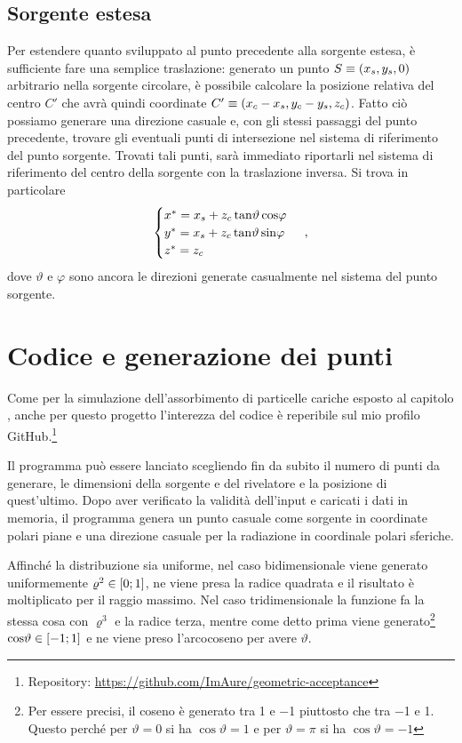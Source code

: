         \subsection{Sorgente estesa}
            Per estendere quanto sviluppato al punto precedente alla sorgente estesa, è sufficiente fare una semplice traslazione: generato un punto $S\equiv\pqty{x_s, y_s, 0}$ arbitrario nella sorgente circolare, è possibile calcolare la posizione relativa del centro $C'$ che avrà quindi coordinate $C'\equiv\pqty{x_c - x_s, y_c - y_s, z_c}$. Fatto ciò possiamo generare una direzione casuale e, con gli stessi passaggi del punto precedente, trovare gli eventuali punti di intersezione nel sistema di riferimento del punto sorgente. Trovati tali punti, sarà immediato riportarli nel sistema di riferimento del centro della sorgente con la traslazione inversa. Si trova in particolare
            \begin{equation*}
                \begin{cases}
                    x^* = x_s + z_c\tan\!\vartheta\cos\!\varphi \\
                    y^* = x_s + z_c\tan\!\vartheta\sin\!\varphi \\
                    z^* = z_c
                \end{cases}
                \,,
            \end{equation*}
            dove $\vartheta$ e $\varphi$ sono ancora le direzioni generate casualmente nel sistema del punto sorgente.
    
    \section{Codice e generazione dei punti}
        Come per la simulazione dell'assorbimento di particelle cariche esposto al capitolo , anche per questo progetto l'interezza del codice è reperibile sul mio profilo GitHub.\footnote{Repository: \url{https://github.com/ImAure/geometric-acceptance}}

        Il programma può essere lanciato scegliendo fin da subito il numero di punti da generare, le dimensioni della sorgente e del rivelatore e la posizione di quest'ultimo. Dopo aver verificato la validità dell'input e caricati i dati in memoria, il programma genera un punto casuale come sorgente in coordinate polari piane e una direzione casuale per la radiazione in coordinale polari sferiche.
        
        Affinché la distribuzione sia uniforme, nel caso bidimensionale viene generato uniformemente $\varrho^2 \in \bqty{0;1}$, ne viene presa la radice quadrata e il risultato è moltiplicato per il raggio massimo. Nel caso tridimensionale la funzione fa la stessa cosa con $\varrho^3$ e la radice terza, mentre come detto prima viene generato\footnote{Per essere precisi, il coseno è generato tra \num{1} e \num{-1} piuttosto che tra \num{-1} e \num{1}. Questo perché per $\vartheta = 0$ si ha $\cos\!\vartheta = \num{1}$ e per $\vartheta = \pi$ si ha $\cos\!\vartheta = \num{-1}$} $\cos\!\vartheta \in \bqty{-1;1}$ e ne viene preso l'arcocoseno per avere $\vartheta$.

